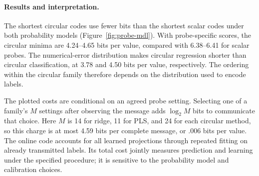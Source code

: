 \paragraph{Results and interpretation.}

The shortest circular codes use fewer bits than the shortest scalar codes under both probability models (Figure~\ref{fig:probe-mdl}).
With probe-specific scores, the circular minima are 4.24--4.65 bits per value, compared with 6.38--6.41 for scalar probes.
The numerical-error distribution makes circular regression shorter than circular classification, at 3.78 and 4.50 bits per value, respectively.
The ordering within the circular family therefore depends on the distribution used to encode labels.

The plotted costs are conditional on an agreed probe setting.
Selecting one of a family's $M$ settings after observing the message adds $\log_2 M$ bits to communicate that choice.
Here $M$ is 14 for ridge, 11 for PLS, and 24 for each circular method, so this charge is at most 4.59 bits per complete message, or .006 bits per value.
The online code accounts for all learned projections through repeated fitting on already transmitted labels.
Its total cost jointly measures prediction and learning under the specified procedure; it is sensitive to the probability model and calibration choices.

\FloatBarrier

